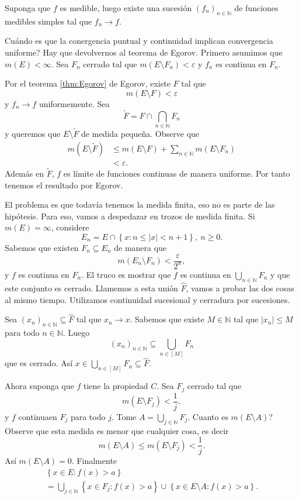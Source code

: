\documentclass[12pt]{article}
\theoremstyle{plain}
\theoremstyle{definition}
\theoremstyle{remark}
\numberwithin{equation}{section}
\newcommand{\bN}{\mathbb{N}}        %
\renewcommand{\geq}{\geqslant}      %
\renewcommand{\leq}{\leqslant}      %
\renewcommand{\:}{\colon}           %
\newcommand{\conj}[1]{\left\lbrace#1\right\rbrace}
\newcommand{\bonj}[1]{\left\lbrack#1\right\rbrack}
\begin{document}
\begin{multicols}{2}
\begin{ptcbp}
Suponga que $f$ es medible, luego existe una sucesión $(f_n)_{n\in\bN}$ de funciones medibles simples tal que $f_n\to f$.\par
Cuándo es que la conergencia puntual y continuidad implican convergencia uniforme? Hay que devolvernos al teorema de Egorov. Primero asumimos que $m(E)<\infty$. Sea $F_n$ cerrado tal que $m(E\setminus F_n)<\varepsilon$ y $f_n$ es continua en $F_n$.\par
Por el teorema \ref{thm:Egorov} de Egorov, existe $F$ tal que
$$m(E\setminus F)<\varepsilon$$
y $f_n\to f$ uniformemente. Sea
$$\tilde{F}=F\cap\bigcap_{n\in\bN}F_n$$
 y queremos que $E\setminus\tilde{F}$ de medida pequeña. Observe que
 \begin{align*}
   m(E\setminus\tilde{F}) &\leq m(E\setminus F)+\sum_{n\in\bN}m(E\setminus F_n)\\
   &<\varepsilon.
 \end{align*}
 Además en $\tilde{F}$, $f$ es límite de funciones continuas de manera uniforme. Por tanto tenemos el resultado por Egorov.\par
 El problema es que todavía tenemos la medida finita, eso no es parte de las hipótesis. Para eso, vamos a despedazar en trozos de medida finita. Si $m(E)=\infty$, considere
 $$E_n=E\cap\conj{x\: n\leq|x|<n+1},\ n\geq 0.$$
 Sabemos que existen $F_n\subseteq E_n$ de manera que
 $$m(E_n\setminus F_n)<\frac{\varepsilon}{2^n},$$
 y $f$ es continua en $F_n$. El truco es mostrar que $f$ es continua en $\bigcup_{n\in\bN} F_n$ y que este conjunto es cerrado. Llamemos a esta unión $\hat{F}$, vamos a probar las dos cosas al mismo tiempo. Utilizamos continuidad sucesional y cerradura por sucesiones.\par
 Sea $(x_n)_{n\in\bN}\subseteq \hat{F}$ tal que $x_n\to x$. Sabemos que existe $M\in\bN$ tal que $|x_n|\leq M$ para todo $n\in\bN$.  Luego
 $$(x_n)_{n\in\bN}\subseteq \bigcup_{n\in\bonj{M}}F_n$$
 que es cerrado. Así $x\in \bigcup_{n\in\bonj{M}}F_n\subseteq \hat{F}.$\par
 Ahora suponga que $f$ tiene la propiedad $C$. Sea $F_j$ cerrado tal que
 $$m(E\setminus F_j)<\frac{1}{j},$$
 y $f$ continuaen $F_j$ para todo $j$. Tome $A=\bigcup_{j\in\bN}F_j$. Cuanto es $m(E\setminus A)$? Observe que esta medida es menor que cualquier cosa, es decir
 $$m(E\setminus A)\leq m(E\setminus F_j)<\frac{1}{j}.$$
 Así $m(E\setminus A)=0$. Finalmente
 \begin{gather*}
   \conj{x\in E\: f(x)> a}\\
   =\bigcup_{j\in\bN}\conj{x\in F_j\: f(x)>a}\cup\conj{x\in E\setminus A\: f(x)>a}.
 \end{gather*}
\end{ptcbp}


\end{multicols}
\end{document}
